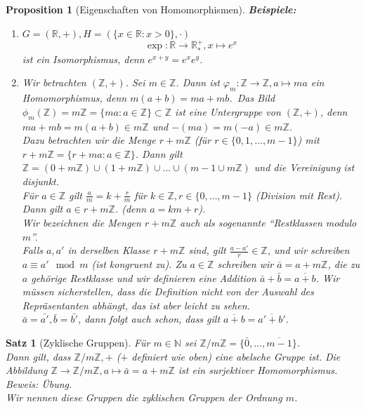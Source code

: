 \documentclass{report}
\newcommand{\IN}[1]{\index{#1|BH}}
\newcommand{\R}{\mathbb{R}}
\newcommand{\N}{\mathbb{N}}
\newcommand{\Z}{\mathbb{Z}}
\theoremstyle{customrem}
\theoremstyle{customdef}
\newtheorem{prop}[definition]{Proposition}
\newtheorem*{satz*}{Satz} %
\begin{document}
\begin{prop}[Eigenschaften von Homomorphismen]
		\textbf{Beispiele:}
		\begin{enumerate}
			\item $G = (\R, +), H = (\{x \in \R : x > 0\}, \cdot)$
				$$\exp : \R \to \R^+_*, x \mapsto e^x$$
				ist ein Isomorphismus, denn $e^{x + y} = e^x e^y$.
			\item Wir betrachten $(\Z, +)$. Sei $m \in \Z$. Dann ist $\varphi_m : \Z \to \Z, a \mapsto ma$ ein Homomorphismus, denn $m(a + b) = ma + mb$.\ Das Bild $\phi_m(\Z) = m\Z = \{m a : a \in \Z\} \subset \Z$  ist eine Untergruppe von $(\Z, +)$, denn $ma + mb = m(a + b) \in m\Z$ und $-(ma) = m(-a) \in m\Z$.\\	Dazu betrachten wir die Menge $r + m\Z$ (für $r \in \{0, 1, \dots, m-1\}$) mit $r + m\Z = \{r+ma : a \in \Z\}$. Dann gilt $\Z = (0 +m\Z) \cup (1 + m\Z) \cup \dots \cup(m-1 \cup m\Z)$ und die Vereinigung ist disjunkt.\\	Für $a \in \Z$ gilt $\frac{a}{m} = k + \frac{r}{m}$ für $k \in \Z, r \in \{0, \dots, m-1\}$ (Division mit Rest). Dann gilt $ a \in r + m\Z$. (denn $a = km + r$).\\	Wir bezeichnen die Mengen $r + m\Z$ auch als sogenannte "`\textit{Restklassen modulo $m$}"'.\\	Falls $a, a'$ in derselben Klasse $r +m\Z$ sind, gilt $\frac{a-a'}{r} \in \Z$, und wir schreiben $a \equiv a' \mod m$ (ist kongruent zu). Zu $a \in \Z$ schreiben wir $\bar{a} = a + m\Z$, die zu $a$ gehörige Restklasse und wir definieren eine Addition $\bar{a} + \bar{b} = \overline{a + b}$. Wir müssen sicherstellen, dass die Definition nicht von der Auswahl des Repräsentanten abhängt, das ist aber leicht zu sehen.\\ $\bar{a} = \bar{a'}, \bar{b} = \bar{b'}$, dann folgt auch schon, dass gilt $\overline{a + b} = \overline{a' + b'}$.
		\end{enumerate}
	\end{prop}
	
	\begin{satz*}[Zyklische Gruppen]
		\IN{Gruppe!zyklische}
		Für $m \in \N$  sei $\Z/m\Z = \{\bar{0}, \dots, \overline{m-1}\}$.\\
		Dann gilt, dass $\Z/m\Z, +$ ($+$ definiert wie oben) eine abelsche Gruppe ist.
		Die Abbildung $\Z \to \Z/m\Z, a \mapsto \bar{a} = a + m\Z$ ist ein surjektiver Homomorphismus.\\
		Beweis: Übung.\\
		Wir nennen diese Gruppen die zyklischen Gruppen der Ordnung $m$.
	\end{satz*}
\end{document}
